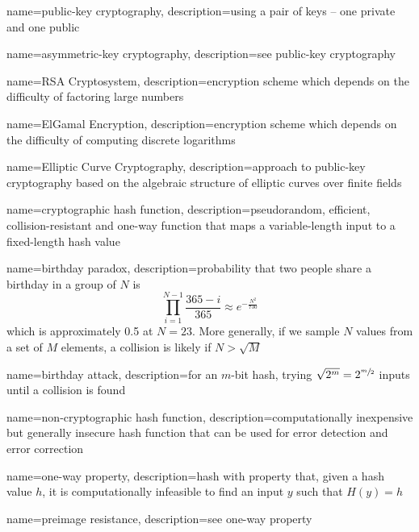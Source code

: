 {
    name={public-key cryptography},
    description={using a pair of keys -- one private and one public}
}

{
    name={asymmetric-key cryptography},
    description={see \gls{public-key cryptography}}
}

{
    name={RSA Cryptosystem},
    description={encryption scheme which depends on the difficulty of factoring large numbers}
}

{
    name={ElGamal Encryption},
    description={encryption scheme which depends on the difficulty of computing discrete logarithms}
}

{
    name={Elliptic Curve Cryptography},
    description={approach to public-key cryptography based on the algebraic structure of elliptic curves over finite fields}
}

{
    name={cryptographic hash function},
    description={pseudorandom, efficient, collision-resistant and one-way function that maps a variable-length input to a fixed-length hash value}
}

{
    name={birthday paradox},
    description={probability that two people share a birthday in a group of $N$ is \[\prod_{i=1}^{N-1}\frac{365 - i}{365} \approx e^{-\frac{N^2}{730}}\] which is approximately 0.5 at $N=23$. More generally, if we sample $N$ values from a set of $M$ elements, a collision is likely if $N > \sqrt{M}$}
}

{
    name={birthday attack},
    description={for an $m$-bit hash, trying $\sqrt{2^m} = 2^{\sfrac{m}{2}}$ inputs until a collision is found}
}

{
    name={non-cryptographic hash function},
    description={computationally inexpensive but generally insecure hash function that can be used for error detection and error correction}
}

{
    name={one-way property},
    description={hash with property that, given a hash value $h$, it is computationally infeasible to find an input $y$ such that $H(y) = h$}
}

{
    name={preimage resistance},
    description={see \gls{one-way property}}
}


